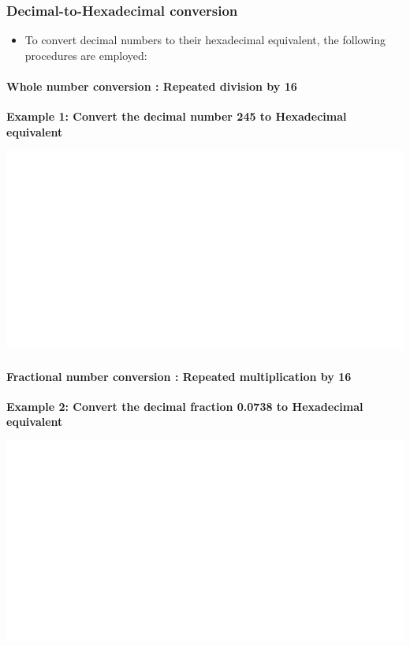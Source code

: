 \documentclass[]{book}
\providecommand{\tightlist}{%
  \setlength{\itemsep}{0pt}\setlength{\parskip}{0pt}}
\let\oldparagraph\paragraph
\renewcommand{\paragraph}[1]{\oldparagraph{#1}\mbox{}}
\begin{document}
\hypertarget{decimal-to-hexadecimal-conversion}{%
\subsubsection{Decimal-to-Hexadecimal conversion}\label{decimal-to-hexadecimal-conversion}}

\begin{itemize}
\tightlist
\item
  To convert decimal numbers to their hexadecimal equivalent, the following procedures are employed:
\end{itemize}

\hypertarget{whole-number-conversion-repeated-division-by-16}{%
\paragraph{Whole number conversion : Repeated division by 16}\label{whole-number-conversion-repeated-division-by-16}}

\textbf{Example 1: Convert the decimal number 245 to Hexadecimal equivalent}

\begin{center}\includegraphics[width=1\linewidth]{figure/NSbox15-1} \end{center}

\hypertarget{fractional-number-conversion-repeated-multiplication-by-16}{%
\paragraph{Fractional number conversion : Repeated multiplication by 16}\label{fractional-number-conversion-repeated-multiplication-by-16}}

\textbf{Example 2: Convert the decimal fraction 0.0738 to Hexadecimal equivalent}

\begin{center}\includegraphics[width=1\linewidth]{figure/NSbox16-1} \end{center}
\end{document}
